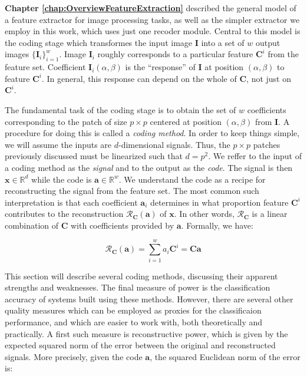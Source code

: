 \documentclass[12pt,a4paper,oneside,english]{UPBThesis}
\newcommand{\hctimes}[2]{{#1}\!\times\!{#2}}
\newcommand{\hcsignalspace}{\mathbb{R}^d}
\newcommand{\hcweightspace}{\mathbb{R}^w}
\begin{document}
\textbf{Chapter \ref{chap:OverviewFeatureExtraction}} described the general model of a feature extractor for image processing tasks, as well as the simpler extractor we employ in this work, which uses just one recoder module. Central to this model is the coding stage which transformes the input image $\textbf{I}$ into a set of $w$ output images $\{\textbf{I}_i\}_{i=1}^w$. Image $\textbf{I}_i$ roughly corresponds to a particular feature $\textbf{C}^i$ from the feature set. Coefficient $\textbf{I}_i(\alpha,\beta)$ is the ``response'' of $\textbf{I}$ at position $(\alpha,\beta)$ to feature $\textbf{C}^i$. In general, this response can depend on the whole of $\textbf{C}$, not just on $\textbf{C}^i$.

The fundamental task of the coding stage is to obtain the set of $w$ coefficients corresponding to the patch of size $\hctimes{p}{p}$ centered at position $(\alpha,\beta)$ from $\textbf{I}$. A procedure for doing this is called a \emph{coding method}. In order to keep things simple, we will assume the inputs are $d$-dimensional signals. Thus, the $\hctimes{p}{p}$ patches previously discussed must be linearized such that $d = p^2$. We reffer to the input of a coding method as the \emph{signal} and to the output as the \emph{code}. The signal is then $\textbf{x} \in \hcsignalspace$ while the code is $\textbf{a} \in \hcweightspace$. We understand the code as a recipe for reconstructing the signal from the feature set. The most common such interpretation is that each coefficient $\textbf{a}_i$ determines in what proportion feature $\textbf{C}^i$ contributes to the reconstruction $\mathcal{R}_\textbf{C}(\textbf{a})$ of $\textbf{x}$. In other words, $\mathcal{R}_\textbf{C}$ is a linear combination of $\textbf{C}$ with coefficients provided by $\textbf{a}$. Formally, we have:

\begin{equation*}
\mathcal{R}_\textbf{C}(\textbf{a}) = \sum_{i=1}^{w}{a_i \textbf{C}^i} = \textbf{C}\textbf{a}
\end{equation*}

This section will describe several coding methods, discussing their apparent strengths and weaknesses. The final measure of power is the classification accuracy of systems built using these methods. However, there are several other quality measures which can be employed as proxies for the classificaion performance, and which are easier to work with, both theoretically and practically. A first such measure is reconstructive power, which is given by the expected squared norm of the error between the original and reconstructed signals. More precisely, given the code $\textbf{a}$, the squared Euclidean norm of the error is:
\end{document}
